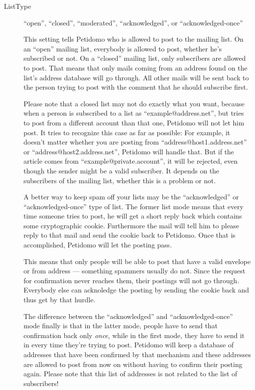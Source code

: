 \documentclass[a4paper,10pt]{scrreprt}
\begin{document}
\begin{description}

\item[ListType] \hfill ``open'', ``closed'',  ``moderated'',
``acknowledged'', or ``acknowledged-once''

This setting tells Petidomo who is allowed to post to the mailing
list. On an ``open'' mailing list, everybody is allowed to post,
whether he's subscribed or not. On a ``closed'' mailing list, only
subscribers are allowed to post. That means that only mails coming
from an address found on the list's address database will go through.
All other mails will be sent back to the person trying to post with
the comment that he should subscribe first.

Please note that a closed list may not do exactly what you want,
because when a person is subscribed to a list as
``example@address.net'', but tries to post from a different account
than that one, Petidomo will not let him post. It tries to recognize
this case as far as possible: For example, it doesn't matter whether
you are posting from ``address@host1.address.net'' or
``address@host2.address.net'', Petidomo will handle that. But if the
article comes from ``example@private.account'', it will be rejected,
even though the sender might be a valid subscriber. It depends on the
subscribers of the mailing list, whether this is a problem or not.

A better way to keep spam off your lists may be the ``acknowledged''
or ``acknowledged-once'' type of list. The former list mode means that
every time someone tries to post, he will get a short reply back which
contains some cryptographic cookie. Furthermore the mail will tell
him to please reply to that mail and send the cookie back to Petidomo.
Once that is accomplished, Petidomo will let the posting pass.

This means that only people will be able to post that have a valid
envelope or from address --- something spammers usually do not. Since
the request for confirmation never reaches them, their postings will
not go through. Everybody else can acknoledge the posting by sending
the cookie back and thus get by that hurdle.

The difference between the ``acknowledged'' and ``acknowledged-once''
mode finally is that in the latter mode, people have to send that
confirmation back only \emph{once}, while in the first mode, they have
to send it in every time they're trying to post. Petidomo will keep a
database of addresses that have been confirmed by that mechanism and
these addresses are allowed to post from now on without having to
confirm their posting again. Please note that this list of addresses
is not related to the list of subscribers!


\end{description}
\end{document}
